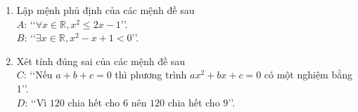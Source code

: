 
\begin{bt}%
	\begin{enumerate}
		\item Lập mệnh phủ định của các mệnh đề sau\\
		$A$: \lq\lq$\forall x\in\mathbb{R},x^2\leq 2x-1$\rq\rq.\\
		$B$: \lq\lq$\exists x\in\mathbb{R},x^2-x+1<0$\rq\rq.
		\item Xét tính đúng sai của các mệnh đề sau\\
		$C$: \lq\lq Nếu $a+b+c=0$ thì phương trình $ax^2+bx+c=0$ có một nghiệm bằng 1\rq\rq.\\
		$D$: \lq\lq Vì $120$ chia hết cho $6$ nên $120$ chia hết cho $9$\rq\rq.
	\end{enumerate}
\end{bt}
